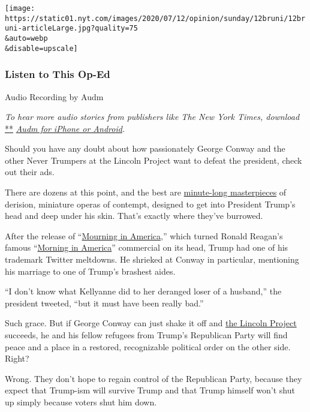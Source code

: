 \texttt{[image: https://static01.nyt.com/images/2020/07/12/opinion/sunday/12bruni/12bruni-articleLarge.jpg?quality=75\\\&auto=webp\\\&disable=upscale]}

\hypertarget{listen-to-this-op-ed}{%
\subsubsection{Listen to This Op-Ed}\label{listen-to-this-op-ed}}

Audio Recording by Audm

\emph{To hear more audio stories from publishers like The New York
Times, download}
\href{https://www.audm.com/?utm_source=nytmag\&utm_medium=embed\&utm_campaign=left_behind_draper}{**}
\href{https://www.audm.com/?utm_source=nytopinion\&utm_medium=embed\&utm_campaign=republicans_destroy_trump}{\emph{Audm
for iPhone or Android}}\emph{.}

Should you have any doubt about how passionately George Conway and the
other Never Trumpers at the Lincoln Project want to defeat the
president, check out their ads.

There are dozens at this point, and the best are
\href{https://www.bostonglobe.com/2020/07/04/nation/take-look-dozen-lincoln-projects-most-devastating-anti-trump-ads/}{minute-long
masterpieces} of derision, miniature operas of contempt, designed to get
into President Trump's head and deep under his skin. That's exactly
where they've burrowed.

After the release of
``\href{https://www.youtube.com/watch?v=t_yG_-K2MDo}{Mourning in
America},'' which turned Ronald Reagan's famous
``\href{https://www.washingtonpost.com/video/politics/ronald-reagan-morning-in-america-campaign-1984/2018/09/10/e42baddc-b525-11e8-ae4f-2c1439c96d79_video.html}{Morning
in America}'' commercial on its head, Trump had one of his trademark
Twitter meltdowns. He shrieked at Conway in particular, mentioning his
marriage to one of Trump's brashest aides.

``I don't know what Kellyanne did to her deranged loser of a husband,''
the president tweeted, ``but it must have been really bad.''

Such grace. But if George Conway can just shake it off and
\href{https://lincolnproject.us/}{the Lincoln Project} succeeds, he and
his fellow refugees from Trump's Republican Party will find peace and a
place in a restored, recognizable political order on the other side.
Right?

Wrong. They don't hope to regain control of the Republican Party,
because they expect that Trump-ism will survive Trump and that Trump
himself won't shut up simply because voters shut him down.

